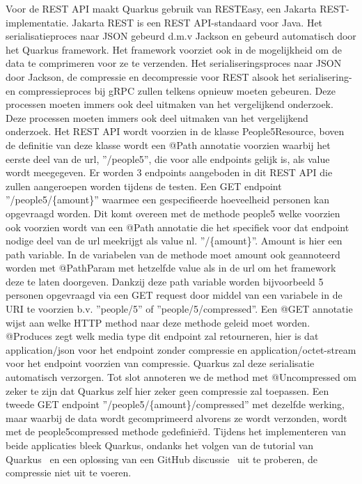Voor de REST API maakt Quarkus gebruik van RESTEasy, een Jakarta REST-implementatie. Jakarta REST is een REST API-standaard voor Java.
Het serialisatieproces naar JSON gebeurd d.m.v Jackson en gebeurd automatisch door het Quarkus framework.
Het framework voorziet ook in de mogelijkheid om de data te comprimeren voor ze te verzenden.
Het serialiseringsproces naar JSON door Jackson, de compressie en decompressie voor REST alsook het serialisering- en compressieproces bij gRPC zullen telkens opnieuw moeten gebeuren.
Deze processen moeten immers ook deel uitmaken van het vergelijkend onderzoek.
Deze processen moeten immers ook deel uitmaken van het vergelijkend onderzoek.
Het REST API wordt voorzien in de klasse People5Resource, boven de definitie van deze klasse wordt een @Path annotatie voorzien waarbij
het eerste deel van de url, ''/people5'', die voor alle endpoints gelijk is, als value wordt meegegeven.
Er worden 3 endpoints aangeboden in dit REST API die zullen aangeroepen worden tijdens de testen. Een GET endpoint ''/people5/\{amount\}'' waarmee een gespecifieerde hoeveelheid
personen kan opgevraagd worden. Dit komt overeen met de methode people5 welke voorzien ook voorzien wordt van een @Path annotatie
die het specifiek voor dat endpoint nodige deel van de url meekrijgt als value nl. ''/\{amount\}''. Amount is hier een path variable. In de variabelen van
de methode moet amount ook geannoteerd worden met @PathParam met hetzelfde value als in de url om het framework deze te laten doorgeven.
Dankzij deze path variable worden bijvoorbeeld 5 personen opgevraagd via een GET request door middel van een variabele in de URI te voorzien b.v.
''people/5'' of ''people/5/compressed''.
Een @GET annotatie wijst aan welke HTTP method naar deze methode geleid moet worden. @Produces zegt welk media type dit endpoint zal retourneren, hier is dat application/json
voor het endpoint zonder compressie en application/octet-stream voor het endpoint voorzien van compressie.
Quarkus zal deze serialisatie automatisch verzorgen. Tot slot annoteren we de method met @Uncompressed om zeker te zijn dat Quarkus zelf hier zeker geen compressie zal toepassen.
Een tweede GET endpoint ''/people5/\{amount\}/compressed'' met dezelfde werking, maar waarbij de data wordt gecomprimeerd alvorens ze wordt verzonden,
wordt met de people5compressed methode gedefinie\"rd. Tijdens het implementeren van beide applicaties bleek Quarkus, ondanks het volgen van de tutorial van Quarkus~\parencite{quarkusgzipcompressie}
en een oplossing van een GitHub discussie~\parencite{quarkusgzipcompressiegithub} uit te proberen, de compressie niet uit te voeren.
